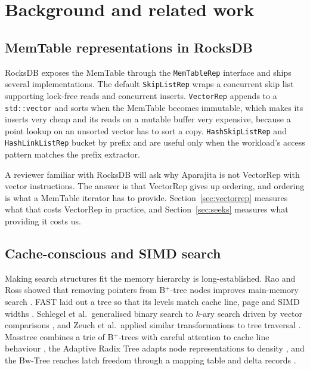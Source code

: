 \documentclass[conference]{IEEEtran}
\begin{document}
\section{Background and related work}

\subsection{MemTable representations in RocksDB}
\label{sec:reps}

RocksDB exposes the MemTable through the \texttt{MemTableRep} interface and ships
several implementations. The default \texttt{SkipListRep} wraps a concurrent skip
list supporting lock-free reads and concurrent inserts. \texttt{VectorRep} appends
to a \texttt{std::vector} and sorts when the MemTable becomes immutable, which
makes its inserts very cheap and its reads on a mutable buffer very expensive,
because a point lookup on an unsorted vector has to sort a copy.
\texttt{HashSkipListRep} and \texttt{HashLinkListRep} bucket by prefix and are
useful only when the workload's access pattern matches the prefix extractor.

A reviewer familiar with RocksDB will ask why Aparajita is not VectorRep with
vector instructions. The answer is that VectorRep gives up ordering, and ordering
is what a MemTable iterator has to provide. Section~\ref{sec:vectorrep} measures
what that costs VectorRep in practice, and Section~\ref{sec:seeks} measures what
providing it costs us.

\subsection{Cache-conscious and SIMD search}

Making search structures fit the memory hierarchy is long-established. Rao and
Ross showed that removing pointers from B$^+$-tree nodes improves main-memory
search \cite{rao2000cache}. FAST laid out a tree so that its levels match cache
line, page and SIMD widths \cite{kim2010fast}. Schlegel et al.\ generalised binary
search to $k$-ary search driven by vector comparisons \cite{schlegel2009kary}, and
Zeuch et al.\ applied similar transformations to tree traversal
\cite{zeuch2014simd}. Masstree combines a trie of B$^+$-trees with careful
attention to cache line behaviour \cite{mao2012masstree}, the Adaptive Radix Tree
adapts node representations to density \cite{leis2013art}, and the Bw-Tree reaches
latch freedom through a mapping table and delta records \cite{levandoski2013bwtree}.
\end{document}
